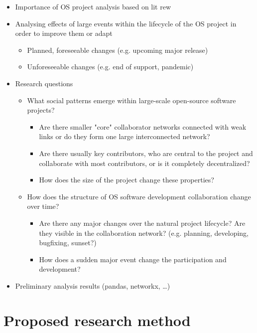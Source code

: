 \begin{itemize}
    \item Importance of OS project analysis based on lit rew
    \item Analysing effects of large events within the lifecycle of the OS project in order to improve them or adapt
    \begin{itemize}
        \item Planned, foreseeable changes (e.g. upcoming major release)
        \item Unforeseeable changes (e.g. end of support, pandemic)
    \end{itemize}
    \item Research questions
    \begin{itemize}
        \item What social patterns emerge within large-scale open-source software projects?
        \begin{itemize}
            \item Are there smaller "core" collaborator networks connected with weak links or do they form one large interconnected network?
            \item Are there usually key contributors, who are central to the project and collaborate with most contributors, or is it completely decentralized?
            \item How does the size of the project change these properties?
        \end{itemize}
        \item How does the structure of OS software development collaboration change over time?
        \begin{itemize}
            \item Are there any major changes over the natural project lifecycle? Are they visible in the collaboration network? (e.g. planning, developing, bugfixing, sunset?)
            \item How does a sudden major event change the participation and development?
        \end{itemize}
    \end{itemize}
    \item Preliminary analysis results (pandas, networkx, \dots)
\end{itemize}


\section{Proposed research method}

